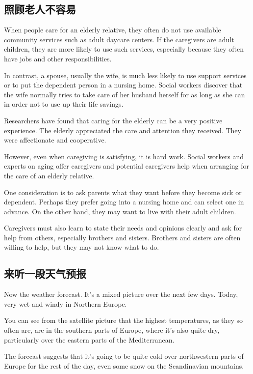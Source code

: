 \subsection{照顾老人不容易}
When people care for an elderly relative, they often do not
use available community services such as adult daycare
centers. If the caregivers are adult children, they are more
likely to use such services, especially because they
often have jobs and other responsibilities.

In contrast, a spouse, usually the wife, is much less likely
to use support services or to put the dependent person in
a nursing home. Social workers discover that the wife
normally tries to take care of her husband herself for as
long as she can in order not to use up their life savings.

Researchers have found that caring for the elderly can be
a very positive experience. The elderly appreciated the
care and attention they received. They were affectionate
and cooperative.

However, even when caregiving is satisfying, it is hard
work. Social workers and experts on aging offer caregivers
and potential caregivers help when arranging for the care
of an elderly relative.

One consideration is to ask parents what they want before
they become sick or dependent. Perhaps they prefer going
into a nursing home and can select one in advance.
On the other hand, they may want to live with their adult
children.

Caregivers must also learn to state their needs and
opinions clearly and ask for help from others, especially
brothers and sisters. Brothers and sisters are often willing to
help, but they may not know what to do.

\subsection{来听一段天气预报}
Now the weather forecast. It's a mixed picture over the
next few days. Today, very wet and windy in Northern Europe.

You can see from the satellite picture that the highest temperatures,
as they so often are, are in the southern
parts of Europe, where it's also quite dry, particularly over
the eastern parts of the Mediterranean.

The forecast suggests that it's going to be quite cold over
northwestern parts of Europe for the rest of the day, even
some snow on the Scandinavian mountains.

